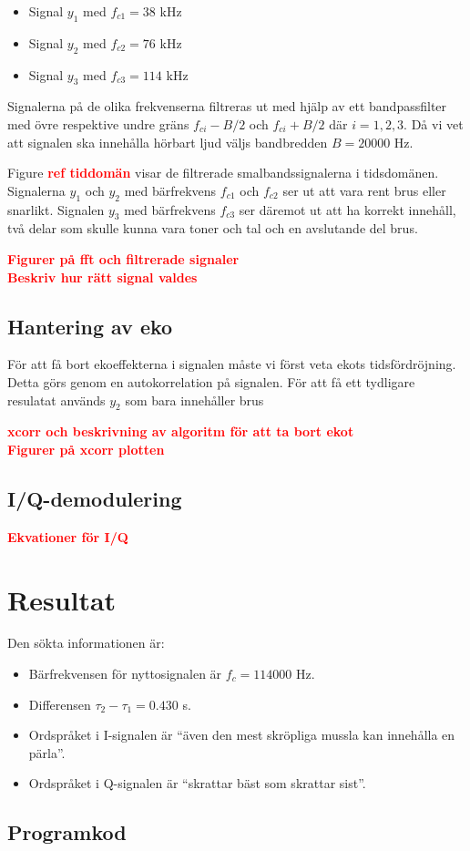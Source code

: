 \documentclass[10pt,twocolumn]{article}
\newcommand{\todo}[1]{\textbf{\textcolor{red}{#1}}}
\begin{document}
\begin{itemize}
\item Signal $y_1$ med $f_{c1}=38$ kHz
\item Signal $y_2$ med $f_{c2}=76$ kHz
\item Signal $y_3$ med $f_{c3}=114$ kHz
\end{itemize}

Signalerna på de olika frekvenserna filtreras ut med hjälp av ett bandpassfilter med övre respektive undre gräns $f_{ci} - B/2$ och $f_{ci} + B/2$ där $i = 1,2,3$. Då vi vet att signalen ska innehålla hörbart ljud väljs bandbredden $B=20000$ Hz.

Figure \todo{ref tiddomän} visar de filtrerade smalbandssignalerna i tidsdomänen. Signalerna $y_1$ och $y_2$ med bärfrekvens $f_{c1}$ och $f_{c2}$ ser ut att vara rent brus eller snarlikt. Signalen $y_3$ med bärfrekvens $f_{c3}$ ser däremot ut att ha korrekt innehåll, två delar som skulle kunna vara toner och tal och en avslutande del brus.

\todo{Figurer på fft och filtrerade signaler} \\
\todo{Beskriv hur rätt signal valdes} \\

\subsection{Hantering av eko}
För att få bort ekoeffekterna i signalen måste vi först veta ekots tidsfördröjning. Detta görs genom en autokorrelation på signalen. För att få ett tydligare resulatat används $y_2$ som bara innehåller brus

\todo{xcorr och beskrivning av algoritm för att ta bort ekot} \\
\todo{Figurer på xcorr plotten} \\

\subsection{I/Q-demodulering}
\todo{Ekvationer för I/Q} \\

\section{Resultat}

Den sökta informationen är:

\begin{itemize}
\item Bärfrekvensen för nyttosignalen är $f_c = 114000$ Hz.
\item Differensen $\tau_{2} - \tau_{1} = 0.430$ s.
\item Ordspråket i I-signalen är ``även den mest skröpliga mussla kan innehålla en pärla''.
\item Ordspråket i Q-signalen är ``skrattar bäst som skrattar sist''.
\end{itemize}

\clearpage

\begin{appendices}
\section{Programkod}

\end{appendices}
\end{document}
